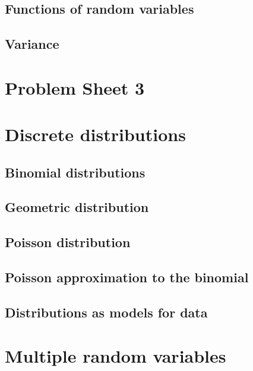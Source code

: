 \documentclass[
  a4paper,
]{book}
\theoremstyle{definition}
\theoremstyle{definition}
\theoremstyle{definition}
\theoremstyle{remark}
\begin{document}
\hypertarget{functions}{%
\section{Functions of random variables}\label{functions}}

\hypertarget{variance}{%
\section{Variance}\label{variance}}

\hypertarget{P3}{%
\chapter*{Problem Sheet 3}\label{P3}}

\hypertarget{S06-discrete-dist}{%
\chapter{Discrete distributions}\label{S06-discrete-dist}}

\hypertarget{binomial}{%
\section{Binomial distributions}\label{binomial}}

\hypertarget{geometric}{%
\section{Geometric distribution}\label{geometric}}

\hypertarget{poisson}{%
\section{Poisson distribution}\label{poisson}}

\hypertarget{poisson-approx}{%
\section{Poisson approximation to the binomial}\label{poisson-approx}}

\hypertarget{models}{%
\section{Distributions as models for data}\label{models}}

\hypertarget{S07-multi-rv}{%
\chapter{Multiple random variables}\label{S07-multi-rv}}
\end{document}
